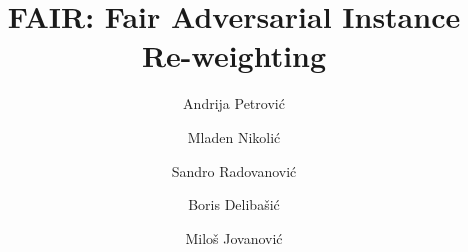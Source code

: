 \documentclass[preprint,12pt]{elsarticle}
\begin{document}
\begin{frontmatter}



\title{FAIR: Fair Adversarial Instance Re-weighting}
\tnotetext[label1]{}


\author[SIN]{Andrija Petrović}
\author[MATF]{Mladen Nikolić}
\author[FON]{Sandro Radovanović}
\author[FON]{Boris Delibašić}
\author[FON]{Miloš Jovanović}

\address[SIN]{Singidunum University - Technical Faculty, Danijelova 32, Belgrade, Serbia}
\address[FON]{University of Belgrade - Faculty of Organizational Sciences, Jove Ilica 154, Belgrade, Serbia}
\address[MATF]{University of Belgrade - Faculty of Mathematics, Studentski Trg 16, Belgrade, Serbia}




\end{frontmatter}
\end{document}
